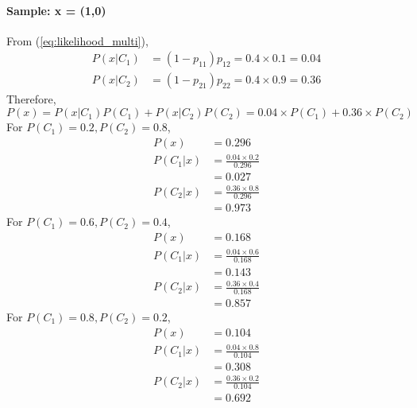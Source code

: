 \paragraph{Sample: x = (1,0)}
From (\ref{eq:likelihood_multi}),
\begin{equation*}
	\begin{split}
		P(x|C_1) &= (1-p_{11})p_{12} = 0.4 \times 0.1 = 0.04\\
		P(x|C_2) &= (1-p_{21})p_{22} = 0.4 \times 0.9 = 0.36
	\end{split}
\end{equation*}
Therefore,
\begin{equation*}\label{eq:evidence_multi}
	P(x) = P(x|C_1)P(C_1) + P(x|C_2)P(C_2) = 0.04\times P(C_1) + 0.36 \times P(C_2)
\end{equation*}
For $P(C_1) = 0.2, P(C_2) = 0.8$,
\begin{equation*}
	\begin{split}
		P(x) &= 0.296\\
		P(C_1|x) &= \frac{0.04\times 0.2}{0.296}\\
		&= 0.027\\
		P(C_2|x) &= \frac{0.36 \times 0.8}{0.296}\\
		&= 0.973
	\end{split}
\end{equation*}
For $P(C_1) = 0.6, P(C_2) = 0.4$,
\begin{equation*}
	\begin{split}
		P(x) &= 0.168\\
		P(C_1|x) &= \frac{0.04\times 0.6}{0.168}\\
		&= 0.143\\
		P(C_2|x) &= \frac{0.36 \times 0.4}{0.168}\\
		&= 0.857
	\end{split}
\end{equation*}
For $P(C_1) = 0.8, P(C_2) = 0.2$,
\begin{equation*}
	\begin{split}
		P(x) &= 0.104\\
		P(C_1|x) &= \frac{0.04\times 0.8}{0.104}\\
		&= 0.308\\
		P(C_2|x) &= \frac{0.36 \times 0.2}{0.104}\\
		&= 0.692
	\end{split}
\end{equation*}
